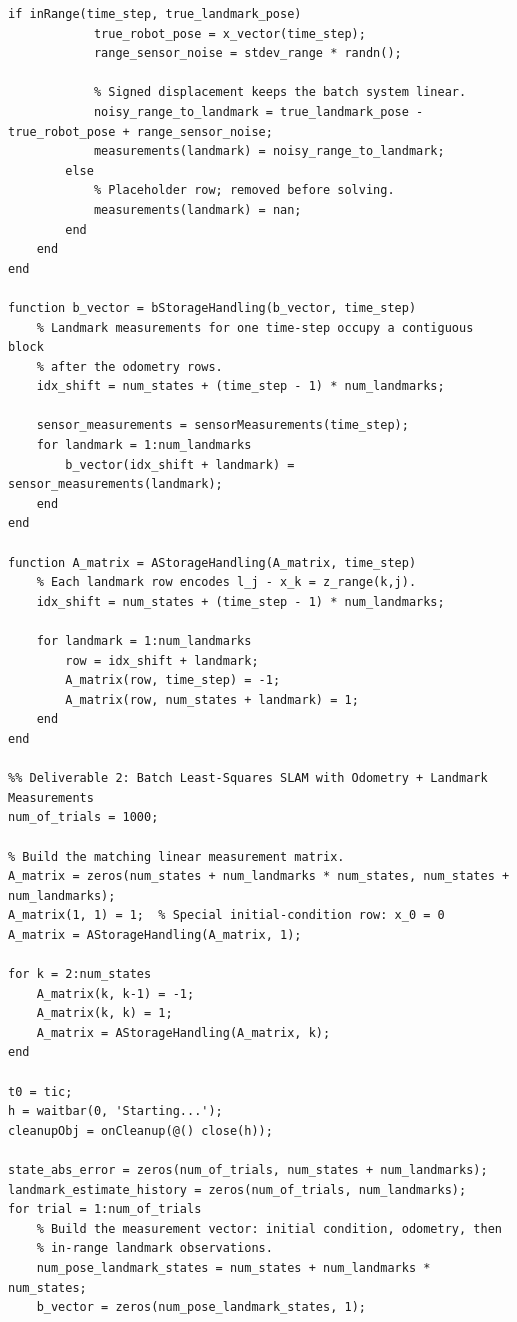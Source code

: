 \documentclass[11pt]{article}
\begin{document}
\begin{lstlisting}[caption={sim2.m}, label={lst:sim2}]
        if inRange(time_step, true_landmark_pose)
            true_robot_pose = x_vector(time_step);
            range_sensor_noise = stdev_range * randn();

            % Signed displacement keeps the batch system linear.
            noisy_range_to_landmark = true_landmark_pose - true_robot_pose + range_sensor_noise;
            measurements(landmark) = noisy_range_to_landmark;
        else
            % Placeholder row; removed before solving.
            measurements(landmark) = nan;
        end
    end
end

function b_vector = bStorageHandling(b_vector, time_step)
    % Landmark measurements for one time-step occupy a contiguous block
    % after the odometry rows.
    idx_shift = num_states + (time_step - 1) * num_landmarks;

    sensor_measurements = sensorMeasurements(time_step);
    for landmark = 1:num_landmarks
        b_vector(idx_shift + landmark) = sensor_measurements(landmark);
    end
end

function A_matrix = AStorageHandling(A_matrix, time_step)
    % Each landmark row encodes l_j - x_k = z_range(k,j).
    idx_shift = num_states + (time_step - 1) * num_landmarks;

    for landmark = 1:num_landmarks
        row = idx_shift + landmark;
        A_matrix(row, time_step) = -1;
        A_matrix(row, num_states + landmark) = 1;
    end
end

%% Deliverable 2: Batch Least-Squares SLAM with Odometry + Landmark Measurements
num_of_trials = 1000;

% Build the matching linear measurement matrix.
A_matrix = zeros(num_states + num_landmarks * num_states, num_states + num_landmarks);
A_matrix(1, 1) = 1;  % Special initial-condition row: x_0 = 0
A_matrix = AStorageHandling(A_matrix, 1);

for k = 2:num_states
    A_matrix(k, k-1) = -1;
    A_matrix(k, k) = 1;
    A_matrix = AStorageHandling(A_matrix, k);
end

t0 = tic;
h = waitbar(0, 'Starting...');
cleanupObj = onCleanup(@() close(h));

state_abs_error = zeros(num_of_trials, num_states + num_landmarks);
landmark_estimate_history = zeros(num_of_trials, num_landmarks);
for trial = 1:num_of_trials
    % Build the measurement vector: initial condition, odometry, then
    % in-range landmark observations.
    num_pose_landmark_states = num_states + num_landmarks * num_states;
    b_vector = zeros(num_pose_landmark_states, 1);


\end{lstlisting}
\end{document}
